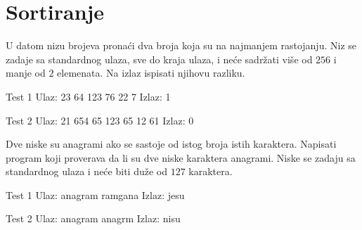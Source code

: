 \section{Sortiranje}


\begin{Exercise}[label=501]
  U datom nizu brojeva pronaći dva broja koja su na najmanjem
  rastojanju. Niz se zadaje sa standardnog ulaza, sve do kraja ulaza,
  i neće sadržati više od $256$ i manje od $2$ elemenata. Na izlaz
  ispisati njihovu razliku.  
  
\begin{miditest}
\begin{test}{Test 1}
Ulaz:   23 64 123 76 22 7
Izlaz:  1
\end{test}
\end{miditest}

\begin{miditest}
\begin{test}{Test 2}
Ulaz:   21 654 65 123 65 12 61
Izlaz:  0
\end{test}
\end{miditest}
  
\end{Exercise}

\begin{Answer}[ref=501]
\end{Answer}
\begin{Exercise}[label=502]
  Dve niske su anagrami ako se sastoje od istog broja istih
  karaktera. Napisati program koji proverava da li su dve niske
  karaktera anagrami.  Niske se zadaju sa standardnog ulaza i neće
  biti duže od $127$ karaktera.  
  
\begin{miditest}
\begin{test}{Test 1}
Ulaz:   anagram ramgana
Izlaz:  jesu
\end{test}
\end{miditest}
\begin{miditest}
\begin{test}{Test 2}
Ulaz:   anagram anagrm
Izlaz:  nisu
\end{test}
\end{miditest}
  
\end{Exercise}

